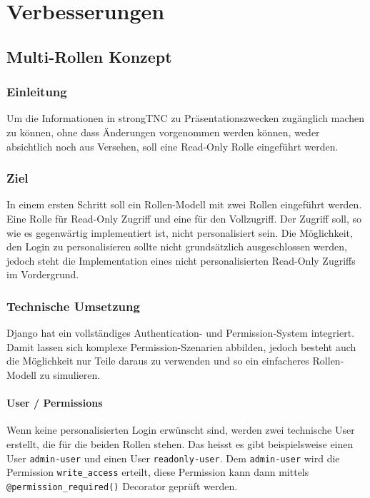 \section{Verbesserungen}

\subsection{Multi-Rollen Konzept}

\subsubsection{Einleitung}

Um die Informationen in strongTNC zu Präsentationszwecken zugänglich machen zu können, 
ohne dass Änderungen vorgenommen werden können, weder absichtlich noch aus Versehen, 
soll eine Read-Only Rolle eingeführt werden.


\subsubsection{Ziel}

In einem ersten Schritt soll ein Rollen-Modell mit zwei Rollen eingeführt werden. 
Eine Rolle für Read-Only Zugriff und eine für den Vollzugriff. Der Zugriff soll, 
so wie es gegenwärtig implementiert ist, nicht personalisiert sein. Die Möglichkeit, 
den Login zu personalisieren sollte nicht grundsätzlich ausgeschlossen werden, jedoch 
steht die Implementation eines nicht personalisierten Read-Only Zugriffs im Vordergrund.


\subsubsection{Technische Umsetzung}

Django hat ein vollständiges Authentication- und Permission-System integriert. Damit 
lassen sich komplexe Permission-Szenarien abbilden, jedoch besteht auch die Möglichkeit 
nur Teile daraus zu verwenden und so ein einfacheres Rollen-Modell zu simulieren.

\paragraph*{User / Permissions}

Wenn keine personalisierten Login erwünscht sind, werden zwei technische User
erstellt, die für die beiden Rollen stehen. Das heisst es gibt beispielsweise
einen User \texttt{admin-user} und einen User \texttt{readonly-user}. Dem
\texttt{admin-user} wird die Permission \texttt{write\_access} erteilt, diese
Permission kann dann mittels \texttt{@permission\_required()} Decorator geprüft
werden.

